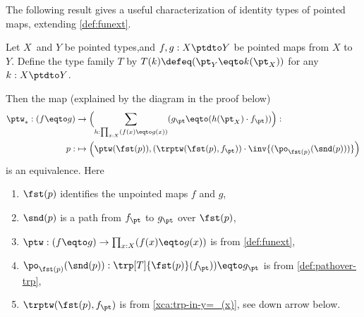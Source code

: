 The following result gives a useful characterization of 
identity types of pointed maps, extending \cref{def:funext}.
\begin{lemma}\label{lem:identity-ptd-maps}
Let $X$ and $Y$ be pointed types,and
$f,g: X\ptdto Y$ be pointed maps from $X$ to $Y$. Define the type family $T$
by $T(k) \defeq (\pt_Y\eqto k(\pt_X))$ for any $k: X\ptdto Y$.
\begin{marginfigure}
  \caption{$g_\pt \protect\eqto (h(\pt_X)\cdot f_\pt)$ } 
\end{marginfigure}
Then the map (explained by the diagram in the proof below)
\begin{align*}
\ptw_* : (f\eqto g)&\to \Bigl(\sum_{h:\prod_{x:X}(f(x)\eqto g(x))}
                               (g_\pt \eqto (h(\pt_X)\cdot f_\pt) )  \Bigr):\\
p:  &\mapsto \Bigl(\ptw(\fst(p)),(\trptw(\fst(p),f_\pt))\cdot\inv{(\po_{\fst(p)}(\snd(p)))}\Bigr)
\end{align*}
is an equivalence. Here
\begin{enumerate}
\item $\fst(p)$ identifies the unpointed maps $f$ and $g$,
\item $\snd(p)$ is a path from $f_\pt$ to $g_\pt$ over $\fst(p)$,
\item $\ptw: (f\eqto g)\to \prod_{x:X}(f(x)\eqto g(x))$ is from \cref{def:funext}, 
\item $\po_{\fst(p)}(\snd(p)) : \trp[T]{\fst(p)}(f_\pt))\eqto g_\pt$ 
is from \cref{def:pathover-trp},
\item $\trptw(\fst(p),f_\pt)$ 
is from \cref{xca:trp-in-y=_(x)}, see down arrow below.
\end{enumerate}
\end{lemma}
